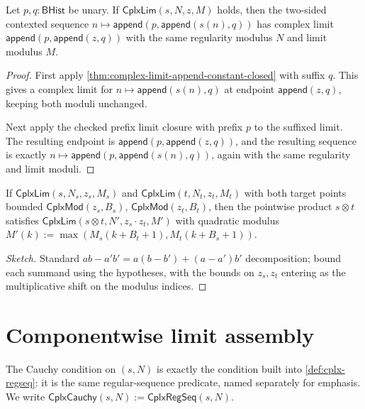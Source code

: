 \begin{theorem}
\label{thm:complex-limit-two-sided-unary-context-closure}
Let $p,q:\mathsf{BHist}$ be unary. If $\mathsf{CplxLim}(s,N,z,M)$ holds, then
the two-sided contexted sequence
$n\mapsto\mathsf{append}(p,\mathsf{append}(s(n),q))$ has complex limit
$\mathsf{append}(p,\mathsf{append}(z,q))$ with the same regularity modulus $N$
and limit modulus $M$.
\end{theorem}
\begin{proof}
First apply \autoref{thm:complex-limit-append-constant-closed} with suffix $q$.
This gives a complex limit for $n\mapsto\mathsf{append}(s(n),q)$ at endpoint
$\mathsf{append}(z,q)$, keeping both moduli unchanged.

Next apply the checked prefix limit closure with prefix $p$ to the suffixed
limit. The resulting endpoint is
$\mathsf{append}(p,\mathsf{append}(z,q))$, and the resulting sequence is exactly
$n\mapsto\mathsf{append}(p,\mathsf{append}(s(n),q))$, again with the same
regularity and limit moduli.
\end{proof}

\begin{theorem}
\label{thm:cplx-lim-product}
If \(\mathsf{CplxLim}(s, N_s, z_s, M_s)\) and \(\mathsf{CplxLim}(t, N_t, z_t, M_t)\) with both target points bounded \(\mathsf{CplxMod}(z_s, B_s)\), \(\mathsf{CplxMod}(z_t, B_t)\), then the pointwise product \(s \otimes t\) satisfies \(\mathsf{CplxLim}(s \otimes t, N', z_s \cdot z_t, M')\) with quadratic modulus \(M'(k) := \max(M_s(k + B_t + 1), M_t(k + B_s + 1))\).
\end{theorem}
\begin{proof}[Sketch]
Standard \(ab - a'b' = a(b-b') + (a-a')b'\) decomposition; bound each summand using the hypotheses, with the bounds on \(z_s, z_t\) entering as the multiplicative shift on the modulus indices.
\end{proof}

\section{Componentwise limit assembly}

\begin{definition}
\label{def:cplx-cauchy}
The Cauchy condition on \((s, N)\) is exactly the condition built into \autoref{def:cplx-regseq}: it is the same regular-sequence predicate, named separately for emphasis. We write \(\mathsf{CplxCauchy}(s, N) := \mathsf{CplxRegSeq}(s, N)\).
\end{definition}


